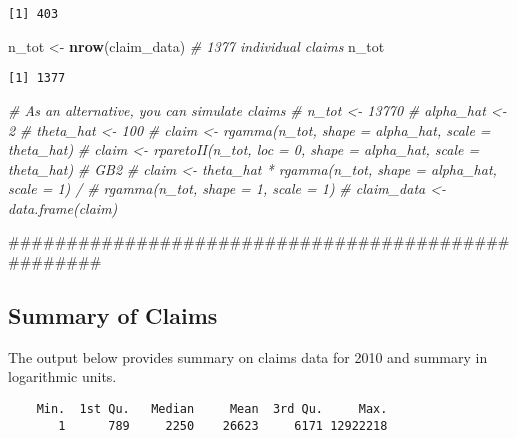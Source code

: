 \documentclass[]{book}
\newenvironment{Shaded}{\begin{snugshade}}{\end{snugshade}}
\newcommand{\KeywordTok}[1]{\textcolor[rgb]{0.13,0.29,0.53}{\textbf{#1}}}
\newcommand{\StringTok}[1]{\textcolor[rgb]{0.31,0.60,0.02}{#1}}
\newcommand{\CommentTok}[1]{\textcolor[rgb]{0.56,0.35,0.01}{\textit{#1}}}
\newcommand{\OperatorTok}[1]{\textcolor[rgb]{0.81,0.36,0.00}{\textbf{#1}}}
\newcommand{\NormalTok}[1]{#1}
\theoremstyle{definition}
\theoremstyle{definition}
\theoremstyle{definition}
\theoremstyle{remark}
\begin{document}
\begin{verbatim}
[1] 403
\end{verbatim}

\begin{Shaded}
\begin{Highlighting}[]
\NormalTok{n_tot <-}\StringTok{ }\KeywordTok{nrow}\NormalTok{(claim_data)  }\CommentTok{# 1377 individual claims}
\NormalTok{n_tot}
\end{Highlighting}
\end{Shaded}

\begin{verbatim}
[1] 1377
\end{verbatim}

\begin{Shaded}
\begin{Highlighting}[]
\CommentTok{# As an alternative, you can simulate claims}
\CommentTok{# n_tot <- 13770}
\CommentTok{# alpha_hat <- 2}
\CommentTok{# theta_hat <- 100}
\CommentTok{# claim <- rgamma(n_tot, shape = alpha_hat, scale = theta_hat)}
\CommentTok{# claim <- rparetoII(n_tot, loc = 0,  shape = alpha_hat, scale = theta_hat)}
\CommentTok{# GB2}
\CommentTok{# claim <- theta_hat * rgamma(n_tot, shape = alpha_hat, scale = 1) / }
\CommentTok{#          rgamma(n_tot, shape = 1, scale = 1) }
\CommentTok{# claim_data <- data.frame(claim)}

\NormalTok{###################################################}
\end{Highlighting}
\end{Shaded}

\subsection{Summary of Claims}\label{summary-of-claims}

The output below provides summary on claims data for 2010 and summary in
logarithmic units.

\begin{Shaded}
\end{Shaded}

\begin{verbatim}
    Min.  1st Qu.   Median     Mean  3rd Qu.     Max. 
       1      789     2250    26623     6171 12922218 
\end{verbatim}
\end{document}
